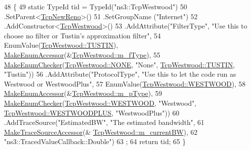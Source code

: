 \begin{DoxyCode}
48 \{
49   \textcolor{keyword}{static} TypeId tid = TypeId(\textcolor{stringliteral}{"ns3::TcpWestwood"})
50     .SetParent<\hyperlink{classns3_1_1TcpNewReno_a81686cb1590be6d7c754029fc8d7cf4e}{TcpNewReno}>()
51     .SetGroupName (\textcolor{stringliteral}{"Internet"})
52     .AddConstructor<\hyperlink{classns3_1_1TcpWestwood_aecff9eac8b8f66830d2e542ad9ccd69c}{TcpWestwood}>()
53     .AddAttribute(\textcolor{stringliteral}{"FilterType"}, \textcolor{stringliteral}{"Use this to choose no filter or Tustin's approximation filter"},
54                   EnumValue(\hyperlink{classns3_1_1TcpWestwood_a705750d92431a17a9997ad6fbf2918aaa57940865dfadfd958171dc42efa5d41e}{TcpWestwood::TUSTIN}), 
      \hyperlink{namespacens3_af5050739867ce63896dec011e332c8ec}{MakeEnumAccessor}(&\hyperlink{classns3_1_1TcpWestwood_a2f18c4bdae2012bc39340c1d919e8495}{TcpWestwood::m\_fType}),
55                   \hyperlink{namespacens3_a48832781a2b521d3d0091e05ece30615}{MakeEnumChecker}(\hyperlink{classns3_1_1TcpWestwood_a705750d92431a17a9997ad6fbf2918aaaec226af638268514e4c173c0483421c1}{TcpWestwood::NONE}, \textcolor{stringliteral}{"None"}, 
      \hyperlink{classns3_1_1TcpWestwood_a705750d92431a17a9997ad6fbf2918aaa57940865dfadfd958171dc42efa5d41e}{TcpWestwood::TUSTIN}, \textcolor{stringliteral}{"Tustin"}))
56     .AddAttribute(\textcolor{stringliteral}{"ProtocolType"}, \textcolor{stringliteral}{"Use this to let the code run as Westwood or WestwoodPlus"},
57                   EnumValue(\hyperlink{classns3_1_1TcpWestwood_aa511ec7338686eb4d01c636f84e3f4d2a32b14b0869d40dfc08e5dc457e246a07}{TcpWestwood::WESTWOOD}),
58                   \hyperlink{namespacens3_af5050739867ce63896dec011e332c8ec}{MakeEnumAccessor}(&\hyperlink{classns3_1_1TcpWestwood_a204ec8fc69424e246a4a9b0be0c0586f}{TcpWestwood::m\_pType}),
59                   \hyperlink{namespacens3_a48832781a2b521d3d0091e05ece30615}{MakeEnumChecker}(\hyperlink{classns3_1_1TcpWestwood_aa511ec7338686eb4d01c636f84e3f4d2a32b14b0869d40dfc08e5dc457e246a07}{TcpWestwood::WESTWOOD}, \textcolor{stringliteral}{"Westwood"},
      \hyperlink{classns3_1_1TcpWestwood_aa511ec7338686eb4d01c636f84e3f4d2a642fb164d4d2dd0e08facf3aa09eb8fc}{TcpWestwood::WESTWOODPLUS}, \textcolor{stringliteral}{"WestwoodPlus"}))
60     .AddTraceSource(\textcolor{stringliteral}{"EstimatedBW"}, \textcolor{stringliteral}{"The estimated bandwidth"},
61                     \hyperlink{group__tracing_gab21a770b9855af4e8f69f7531ea4a6b0}{MakeTraceSourceAccessor}(&
      \hyperlink{classns3_1_1TcpWestwood_a6cd16270e13f4ba8f1da9d5aa3a6d90b}{TcpWestwood::m\_currentBW}),
62                     \textcolor{stringliteral}{"ns3::TracedValueCallback::Double"})
63   ;
64   \textcolor{keywordflow}{return} tid;
65 \}
\end{DoxyCode}


